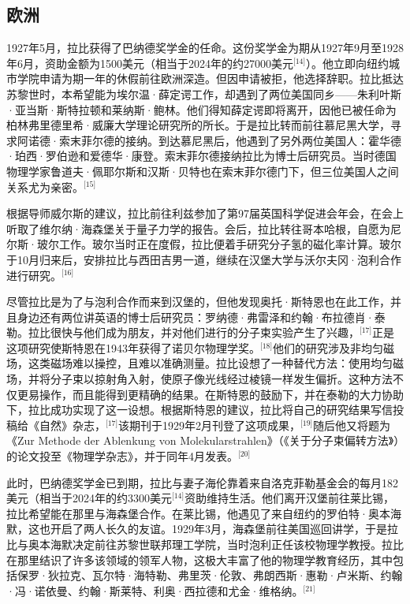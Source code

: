 \subsection{欧洲}
1927年5月，拉比获得了巴纳德奖学金的任命。这份奖学金为期从1927年9月至1928年6月，资助金额为1500美元（相当于2024年的约27000美元\(^\text{[14]}\)）。他立即向纽约城市学院申请为期一年的休假前往欧洲深造。但因申请被拒，他选择辞职。拉比抵达苏黎世时，本希望能为埃尔温·薛定谔工作，却遇到了两位美国同乡——朱利叶斯·亚当斯·斯特拉顿和莱纳斯·鲍林。他们得知薛定谔即将离开，因他已被任命为柏林弗里德里希·威廉大学理论研究所的所长。于是拉比转而前往慕尼黑大学，寻求阿诺德·索末菲尔德的接纳。到达慕尼黑后，他遇到了另外两位美国人：霍华德·珀西·罗伯逊和爱德华·康登。索末菲尔德接纳拉比为博士后研究员。当时德国物理学家鲁道夫·佩耶尔斯和汉斯·贝特也在索末菲尔德门下，但三位美国人之间关系尤为亲密。\(^\text{[15]}\)

根据导师威尔斯的建议，拉比前往利兹参加了第97届英国科学促进会年会，在会上听取了维尔纳·海森堡关于量子力学的报告。会后，拉比转往哥本哈根，自愿为尼尔斯·玻尔工作。玻尔当时正在度假，拉比便着手研究分子氢的磁化率计算。玻尔于10月归来后，安排拉比与西田吉男一道，继续在汉堡大学与沃尔夫冈·泡利合作进行研究。\(^\text{[16]}\)

尽管拉比是为了与泡利合作而来到汉堡的，但他发现奥托·斯特恩也在此工作，并且身边还有两位讲英语的博士后研究员：罗纳德·弗雷泽和约翰·布拉德肖·泰勒。拉比很快与他们成为朋友，并对他们进行的分子束实验产生了兴趣，\(^\text{[17]}\)正是这项研究使斯特恩在1943年获得了诺贝尔物理学奖。\(^\text{[18]}\)他们的研究涉及非均匀磁场，这类磁场难以操控，且难以准确测量。拉比设想了一种替代方法：使用均匀磁场，并将分子束以掠射角入射，使原子像光线经过棱镜一样发生偏折。这种方法不仅更易操作，而且能得到更精确的结果。在斯特恩的鼓励下，并在泰勒的大力协助下，拉比成功实现了这一设想。根据斯特恩的建议，拉比将自己的研究结果写信投稿给《自然》杂志，\(^\text{[17]}\)该期刊于1929年2月刊登了这项成果，\(^\text{[19]}\)随后他又将题为《Zur Methode der Ablenkung von Molekularstrahlen》（《关于分子束偏转方法》）的论文投至《物理学杂志》，并于同年4月发表。\(^\text{[20]}\)

此时，巴纳德奖学金已到期，拉比与妻子海伦靠着来自洛克菲勒基金会的每月182美元（相当于2024年的约3300美元\(^\text{[14]}\)资助维持生活。他们离开汉堡前往莱比锡，拉比希望能在那里与海森堡合作。在莱比锡，他遇见了来自纽约的罗伯特·奥本海默，这也开启了两人长久的友谊。1929年3月，海森堡前往美国巡回讲学，于是拉比与奥本海默决定前往苏黎世联邦理工学院，当时泡利正任该校物理学教授。拉比在那里结识了许多该领域的领军人物，这极大丰富了他的物理学教育经历，其中包括保罗·狄拉克、瓦尔特·海特勒、弗里茨·伦敦、弗朗西斯·惠勒·卢米斯、约翰·冯·诺依曼、约翰·斯莱特、利奥·西拉德和尤金·维格纳。\(^\text{[21]}\)
